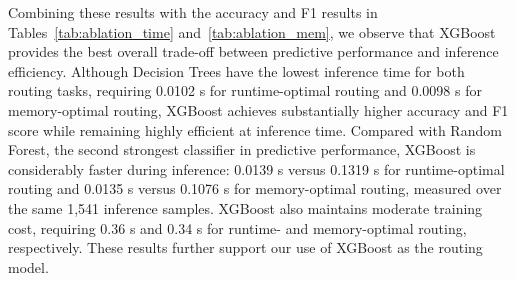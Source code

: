 Combining these results with the accuracy and F1 results in Tables~\ref{tab:ablation_time} and~\ref{tab:ablation_mem}, we observe that XGBoost provides the best overall trade-off between predictive performance and inference efficiency.
Although Decision Trees have the lowest inference time for both routing tasks, requiring 0.0102 s for runtime-optimal routing and 0.0098 s for memory-optimal routing, XGBoost achieves substantially higher accuracy and F1 score while remaining highly efficient at inference time.
Compared with Random Forest, the second strongest classifier in predictive performance, XGBoost is considerably faster during inference: 0.0139 s versus 0.1319 s for runtime-optimal routing and 0.0135 s versus 0.1076 s for memory-optimal routing, measured over the same 1,541 inference samples.
XGBoost also maintains moderate training cost, requiring 0.36 s and 0.34 s for runtime- and memory-optimal routing, respectively.
These results further support our use of XGBoost as the routing model.

